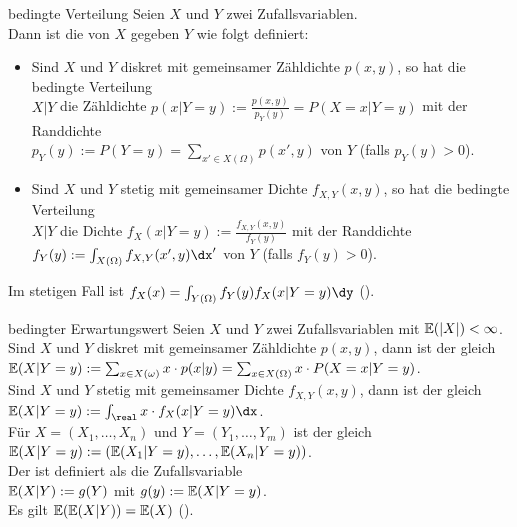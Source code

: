 \begin{Def}{bedingte Verteilung}
    Seien $X$ und $Y$ zwei Zufallsvariablen.\\
    Dann ist die  von $X$ gegeben $Y$ wie folgt definiert:
    \begin{itemize}
        \item
        Sind $X$ und $Y$ diskret mit gemeinsamer Zähldichte $p(x, y)$, so hat
        die bedingte Verteilung\\
        $X|Y$ die Zähldichte
        $p(x|Y=y) := \frac{p(x,y)}{p_Y(y)} = P(X=x|Y=y)$ mit der Randdichte\\
        $p_Y(y) := P(Y=y) = \sum_{x' \in X(\Omega)} p(x', y)$ von $Y$
        (falls $p_Y(y) > 0$).

        \item
        Sind $X$ und $Y$ stetig mit gemeinsamer Dichte $f_{X,Y}(x, y)$, so hat
        die bedingte Verteilung\\
        $X|Y$ die Dichte
        $f_X(x|Y=y) := \frac{f_{X,Y}(x,y)}{f_Y(y)}$ mit der Randdichte\\
        $f_Y(y) := \int_{X(\Omega)} f_{X,Y}(x', y) \dx'$ von $Y$
        (falls $f_Y(y) > 0$).
    \end{itemize}
    Im stetigen Fall ist
    $f_X(x) = \int_{Y(\Omega)} f_Y(y) f_X(x|Y=y)\dy$
    ().
\end{Def}

\begin{Def}{bedingter Erwartungswert}
    Seien $X$ und $Y$ zwei Zufallsvariablen mit $\mathbb{E}(|X|) < \infty$.\\
    Sind $X$ und $Y$ diskret mit gemeinsamer Zähldichte $p(x,y)$,
    dann ist der  gleich
    $\mathbb{E}(X|Y=y) := \sum_{x \in X(\omega)} x \cdot p(x|y) =
    \sum_{x \in X(\Omega)} x \cdot P(X=x|Y=y)$.\\
    Sind $X$ und $Y$ stetig mit gemeinsamer Dichte $f_{X,Y}(x,y)$,
    dann ist der  gleich
    $\EE(X|Y=y) := \int_\real x \cdot f_X(x|Y=y) \dx$.\\
    Für $X = (X_1, \dotsc, X_n)$ und $Y = (Y_1, \dotsc, Y_m)$ ist der
     gleich
    $\mathbb{E}(X|Y=y) := (\mathbb{E}(X_1|Y=y), \dotsc, \mathbb{E}(X_n|Y=y))$.\\
    Der  ist definiert als die
    Zufallsvariable\\
    $\mathbb{E}(X|Y) := g(Y)$ mit $g(y) := \mathbb{E}(X|Y=y)$.\\
    Es gilt $\mathbb{E}(\mathbb{E}(X|Y)) = \mathbb{E}(X)$
    ().
\end{Def}

